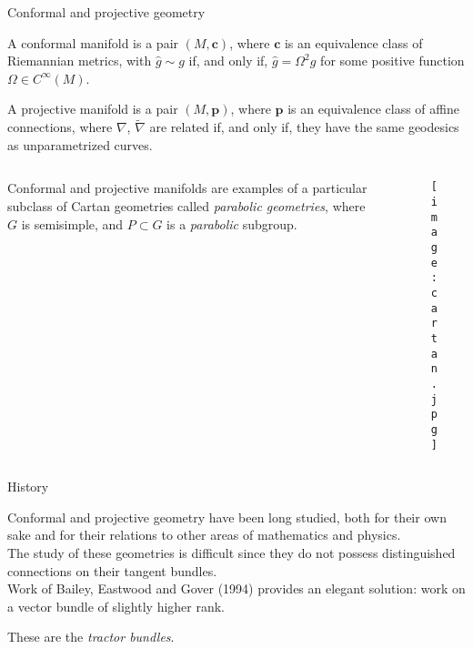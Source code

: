 \documentclass{beamer}
\renewcommand{\hat}{\widehat}
\begin{document}
\begin{frame}{Conformal and projective geometry}

  \begin{definition}
    A conformal manifold is a pair \( (M, \bm{c}) \), where \( \bm{c} \) is an equivalence class of Riemannian metrics, with \( \hat{g} \sim g \) if, and only if, \( \hat{g} = \Omega^2 g \) for some positive function \( \Omega \in C^\infty (M) \).
  \end{definition}
  \pause
  \begin{definition}
    A projective manifold is a pair \( (M, \bm{p}) \), where \( \bm{p} \) is an
    equivalence class of affine connections, where \( \nabla \), \(
    \tilde{\nabla} \) are related if, and only if, they have the same geodesics
    as unparametrized curves.
  \end{definition}

  \vspace{-0.5em}
  \begin{columns}
    \begin{column}{0.6\textwidth}
      \pause
      Conformal and projective manifolds are examples of 
      a particular subclass of Cartan geometries called \emph{parabolic geometries}, where \( G \) is semisimple, and \( P \subset G \) is a \emph{parabolic} subgroup.
    \end{column}
      \begin{column}{0.4\textwidth}
        \hspace{1.5em}
        \vspace{-0.5em}
        \begin{figure}
          \texttt{[image: cartan.jpg]}
        \end{figure}
      \end{column}
  \end{columns}

\end{frame}

\begin{frame}{History}

Conformal and projective geometry have been long studied, both for their own
sake and for their relations to other areas of mathematics and physics.
\vspace{1em}\\
\pause
The study of these geometries is difficult since they do not possess distinguished connections on their tangent bundles.
\vspace{1em}\\
\pause
Work of Bailey, Eastwood and Gover (1994) provides an elegant solution: work on a vector bundle of slightly higher rank. 

These are the \emph{tractor bundles}.

\end{frame}
\end{document}
